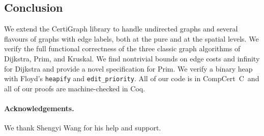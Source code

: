 \subsection{Conclusion}

We extend the CertiGraph library to handle undirected graphs and several flavours of graphs with edge labels, both at the pure and at the spatial levels.  We verify the full functional correctness of the three classic graph algorithms of Dijkstra, Prim, and Kruskal.  We find nontrivial bounds on edge costs and infinity for Dijkstra and provide a novel specification for Prim.  We verify a binary heap with Floyd's \texttt{heapify} and \texttt{edit\_priority}.
All of our code is in CompCert~C~and all of our proofs are machine-checked in Coq.

\paragraph{Acknowledgements.}  We thank Shengyi Wang for his help and support. %










